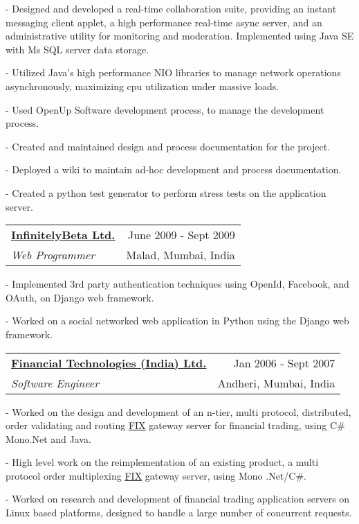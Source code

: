 \documentclass[10pt]{article}
\makeatletter
\newcommand{\employer}[4]{ 
        \vspace*{6pt}
	\begin{tabular*}{\textwidth}{l@{\extracolsep{\fill}}r}
	\textbf{#1} & #2 \\
                #3  & #4 \\ 
	\end{tabular*}
}
\newenvironment{achievements}{
        \vspace{-0pt}
        \begin{list}
        {}
        {\topsep 0pt \itemsep -3pt}
}
{
        \end{list}
}
\makeatother
\begin{document}
	\begin{achievements}
                \item[-] Designed and developed a real-time collaboration suite, providing an instant messaging client applet, a high performance real-time async server, and an administrative utility for monitoring and moderation. Implemented using Java SE with Ms SQL server data storage.
                \item[-] Utilized Java's high performance NIO libraries to manage network operations asynchronously, maximizing cpu utilization under massive loads.
                \item[-] Used OpenUp Software development process, to manage the development process.
                \item[-] Created and maintained design and process documentation for the project.
                \item[-] Deployed a wiki to maintain ad-hoc development and process documentation.
                \item[-] Created a python test generator to perform stress tests on the application server.
	\end{achievements}
\vspace{5pt}
\employer{\href{http://www.InfinitelyBeta.com/}{InfinitelyBeta Ltd.}}{June 2009 - Sept 2009}{\emph{Web Programmer}} {Malad, Mumbai, India}
	\begin{achievements}
                \item[-] Implemented 3rd party authentication techniques using OpenId, Facebook, and OAuth, on Django web framework.
                \item[-] Worked on a social networked web application in Python using the Django web framework.
	\end{achievements}
\vspace{5pt}
\employer{\href{http://www.ftindia.com/}{Financial Technologies (India) Ltd.}}{Jan 2006 - Sept 2007}{\emph{Software Engineer}} {Andheri, Mumbai, India}
	\begin{achievements}
                \item[-] Worked on the design and development of an n-tier, multi protocol, distributed, order validating and routing \href{http://en.wikipedia.org/wiki/FIX_protocol}{FIX} gateway server for financial trading, using C\# Mono.Net and Java.
                \item[-] High level work on the reimplementation of an existing product, a multi protocol order multiplexing \href{http://en.wikipedia.org/wiki/FIX_protocol}{FIX} gateway server, using Mono .Net/C\#.
                \item[-] Worked on research and development of financial trading application servers on Linux based platforms, designed to handle a large number of concurrent requests.
	\end{achievements}
\end{document}

